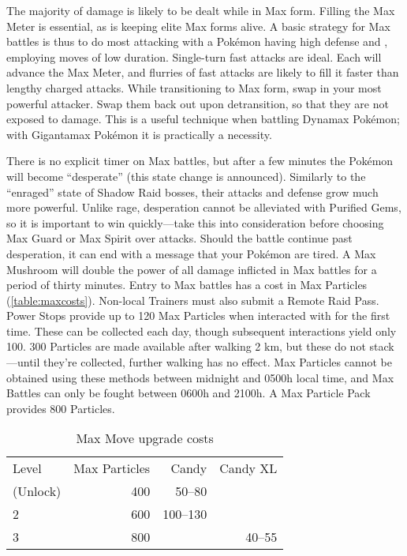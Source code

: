 The majority of damage is likely to be dealt while in Max form.
Filling the Max Meter is essential, as is keeping elite Max forms alive.
A basic strategy for Max battles is thus to do most attacking with a Pokémon having
  high defense and \MHP, employing moves of low duration.
Single-turn fast attacks are ideal.
Each will advance the Max Meter, and flurries of fast attacks are likely to
 fill it faster than lengthy charged attacks.
While transitioning to Max form, swap in your most powerful attacker.
Swap them back out upon detransition, so that they are not exposed to damage.
This is a useful technique when battling Dynamax Pokémon; with Gigantamax Pokémon it is practically a necessity.

There is no explicit timer on Max battles, but after a few minutes the Pokémon
  will become ``desperate'' (this state change is announced).
Similarly to the ``enraged'' state of Shadow Raid bosses, their attacks and
  defense grow much more powerful.
Unlike rage, desperation cannot be alleviated with Purified Gems, so it
  is important to win quickly---take this into consideration before choosing Max Guard or Max Spirit over attacks.
Should the battle continue past desperation, it can end with a message that
  your Pokémon are tired.
A Max Mushroom will double the power of all damage inflicted in
  Max battles for a period of thirty minutes.
Entry to Max battles has a cost in Max Particles (\autoref{table:maxcosts}).
Non-local Trainers must also submit a Remote Raid Pass.
Power Stops provide up to 120 Max Particles when interacted with for the first time.
These can be collected each day, though subsequent interactions yield only 100.
300 Particles are made available after walking 2 km, but these do not stack---until
 they're collected, further walking has no effect.
Max Particles cannot be obtained using these methods between midnight and 0500h local time,
  and Max Battles can only be fought between 0600h and 2100h.
A Max Particle Pack provides 800 Particles.
\begin{table}
\centering
\begin{tabular}{lrrr}
Level & Max Particles & Candy & Candy XL\\
\Midrule
1 (Unlock) & 400 & 50--80 &\\
2          & 600 & 100--130 &\\
3          & 800 & & 40--55\\
\end{tabular}
\caption{Max Move upgrade costs\label{table:maxupgrades}}
\end{table}
